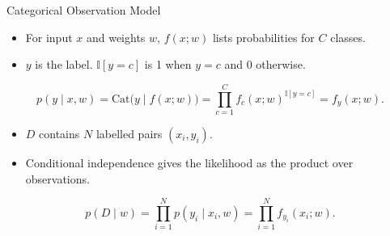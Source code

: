 \begin{frame}{Categorical Observation Model}
    \label{frm:backup-categorical-observation}
    \begin{itemize}
    \item For input $x$ and weights $w$, $f(x;w)$ lists probabilities for $C$ classes.
    \item $y$ is the label. $\mathbb I[y=c]$ is 1 when $y=c$ and 0 otherwise.
    \end{itemize}
    \[
    p(y\mid x,w)=\mathrm{Cat}\bigl(y\mid f(x;w)\bigr)
    =\prod_{c=1}^{C}f_c(x;w)^{\mathbb I[y=c]}=f_y(x;w).
    \]
    \begin{itemize}
    \item $D$ contains $N$ labelled pairs $(x_i,y_i)$.
    \item Conditional independence gives the likelihood as the product over observations.
    \end{itemize}
    \[
    p(D\mid w)=\prod_{i=1}^{N}p(y_i\mid x_i,w)=\prod_{i=1}^{N}f_{y_i}(x_i;w).
    \]
    \end{frame}


